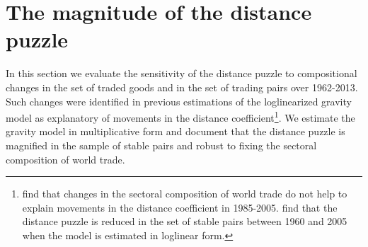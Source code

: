 \documentclass[12pt,twoside,a4paper,notitlepage]{article}
\begin{document}
\section{The magnitude of the distance puzzle} \label{sec:part1} 
In this section we evaluate the sensitivity of the distance puzzle to compositional changes in the set of traded goods and in the set of trading pairs over 1962-2013. Such changes were identified in previous estimations of the loglinearized gravity model as explanatory of movements in the distance coefficient\footnote{\cite{Berthelon2008} find that changes in the sectoral composition of world trade do not help to explain movements in the distance coefficient in 1985-2005. \cite{Head2013} find that the distance puzzle is reduced in the set of stable pairs between 1960 and 2005 when the model is estimated in loglinear form.}. We estimate the gravity model in multiplicative form and document that the distance puzzle is magnified in the sample of stable pairs and robust to fixing the sectoral composition of world trade. 

\end{document}

